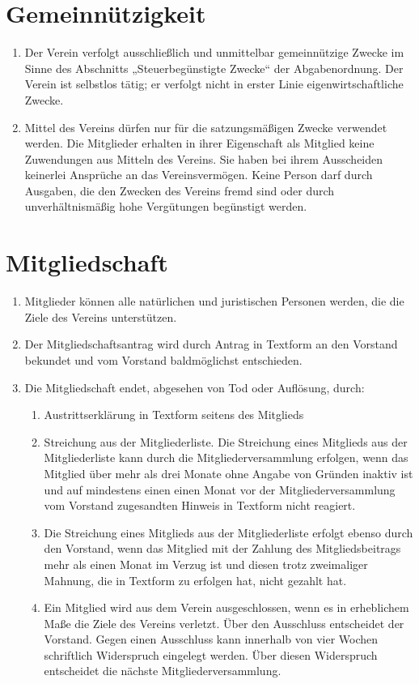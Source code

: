 \documentclass{article}
\begin{document}
\section{Gemeinnützigkeit} 
\label{sec:gemeinnuetzigkeit}  
\begin{enumerate}
\item Der Verein verfolgt ausschließlich und unmittelbar gemeinnützige Zwecke im Sinne des Abschnitts „Steuerbegünstigte Zwecke“ der Abgabenordnung. Der Verein ist selbstlos tätig; er verfolgt nicht in erster Linie eigenwirtschaftliche Zwecke.
\item Mittel des Vereins dürfen nur für die satzungsmäßigen Zwecke verwendet werden. Die Mitglieder erhalten in ihrer Eigenschaft als Mitglied keine Zuwendungen aus Mitteln des Vereins. Sie haben bei ihrem Ausscheiden keinerlei Ansprüche an das Vereinsvermögen. Keine Person darf durch Ausgaben, die den Zwecken des Vereins fremd sind oder durch unverhältnismäßig hohe Vergütungen begünstigt werden.
\end{enumerate}

\section{Mitgliedschaft}
\label{sec:mitgliedschaft}
\begin{enumerate}
\item Mitglieder können alle natürlichen und juristischen Personen werden, die die Ziele des Vereins unterstützen.
\item Der Mitgliedschaftsantrag wird durch Antrag in Textform an den Vorstand bekundet und vom Vorstand baldmöglichst entschieden.
\item Die Mitgliedschaft endet, abgesehen von Tod oder Auflösung, durch:
	\begin{enumerate}
		\item Austrittserklärung in Textform seitens des Mitglieds
		\item Streichung aus der Mitgliederliste. Die Streichung eines Mitglieds aus der  Mitgliederliste kann durch die Mitgliederversammlung erfolgen, wenn das Mitglied über mehr als drei Monate ohne Angabe von Gründen inaktiv ist und auf mindestens einen einen Monat vor der Mitgliederversammlung vom Vorstand zugesandten Hinweis in Textform nicht reagiert.
		\item Die Streichung eines Mitglieds aus der Mitgliederliste erfolgt ebenso durch den Vorstand, wenn das Mitglied mit der Zahlung des Mitgliedsbeitrags mehr als einen Monat im Verzug ist und diesen trotz zweimaliger Mahnung, die in Textform zu erfolgen hat, nicht gezahlt hat.
		\item Ein Mitglied wird aus dem Verein ausgeschlossen, wenn es in erheblichem Maße die Ziele des Vereins verletzt. Über den Ausschluss entscheidet der Vorstand. Gegen einen Ausschluss kann innerhalb von vier Wochen schriftlich Widerspruch eingelegt werden. Über diesen Widerspruch entscheidet die nächste Mitgliederversammlung.
	\end{enumerate}


\end{enumerate}
\end{document}
